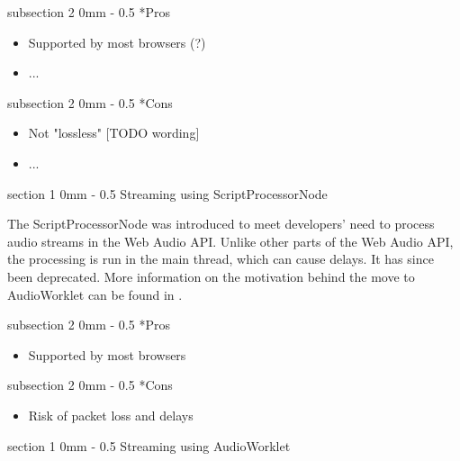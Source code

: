 \documentclass[11pt, a4paper, twoside]{article}
\makeatletter
\renewcommand{\subsection}{\@startsection
   {subsection}%
   {2}%
   {0mm}%
   {-\baselineskip}%
   {0.5\baselineskip}%
   {\bfseries\sffamily\large}}%
\renewcommand{\section}{\@startsection
   {section}%
   {1}%
   {0mm}%
   {-\baselineskip}%
   {0.5\baselineskip}%
   {\bfseries\sffamily\Large}}%
\makeatother
\begin{document}
\subsection*{Pros}
\begin{itemize}
\item Supported by most browsers (?)
\item ...
  \end{itemize}

\subsection*{Cons}
\begin{itemize}
\item Not "lossless" [TODO wording]
\item ...
\end{itemize}

\section{Streaming using ScriptProcessorNode}

The ScriptProcessorNode\cite{scriptprocessornode} was introduced to meet developers' need to process audio streams in the Web Audio API. Unlike other parts of the Web Audio API, the processing is run in the main thread, which can cause delays. It has since been deprecated. More information on the motivation behind the move to AudioWorklet can be found in \cite{icmc}.

\subsection*{Pros}
\begin{itemize}
\item Supported by most browsers
  \end{itemize}

\subsection*{Cons}
\begin{itemize}
\item Risk of packet loss and delays
\end{itemize}


\section{Streaming using AudioWorklet}
\end{document}
